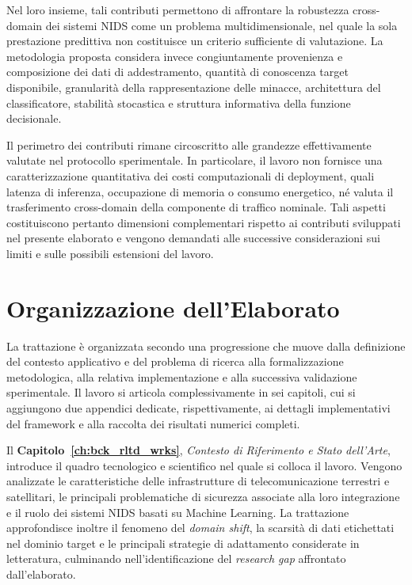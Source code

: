 Nel loro insieme, tali contributi permettono di affrontare la robustezza cross-domain dei sistemi NIDS come un problema multidimensionale, nel quale la sola prestazione predittiva non costituisce un criterio sufficiente di valutazione. 
La metodologia proposta considera invece congiuntamente provenienza e composizione dei dati di addestramento, quantità di conoscenza target disponibile, granularità della rappresentazione delle minacce, architettura del classificatore, stabilità stocastica e struttura informativa della funzione decisionale.

Il perimetro dei contributi rimane circoscritto alle grandezze effettivamente valutate nel protocollo sperimentale. 
In particolare, il lavoro non fornisce una caratterizzazione quantitativa dei costi computazionali di deployment, quali latenza di inferenza, occupazione di memoria o consumo energetico, né valuta il trasferimento cross-domain della componente di traffico nominale. 
Tali aspetti costituiscono pertanto dimensioni complementari rispetto ai contributi sviluppati nel presente elaborato e vengono demandati alle successive considerazioni sui limiti e sulle possibili estensioni del lavoro.




\section{Organizzazione dell'Elaborato}
\label{sec:intro_organizzazione}

La trattazione è organizzata secondo una progressione che muove dalla definizione del contesto applicativo e del problema di ricerca alla formalizzazione metodologica, alla relativa implementazione e alla successiva validazione sperimentale. 
Il lavoro si articola complessivamente in sei capitoli, cui si aggiungono due appendici dedicate, rispettivamente, ai dettagli implementativi del framework e alla raccolta dei risultati numerici completi.

Il \textbf{Capitolo~\ref{ch:bck_rltd_wrks}}, \textit{Contesto di Riferimento e Stato dell'Arte}, introduce il quadro tecnologico e scientifico nel quale si colloca il lavoro. 
Vengono analizzate le caratteristiche delle infrastrutture di telecomunicazione terrestri e satellitari, le principali problematiche di sicurezza associate alla loro integrazione e il ruolo dei sistemi NIDS basati su Machine Learning. 
La trattazione approfondisce inoltre il fenomeno del \textit{domain shift}, la scarsità di dati etichettati nel dominio target e le principali strategie di adattamento considerate in letteratura, culminando nell'identificazione del \textit{research gap} affrontato dall'elaborato.

